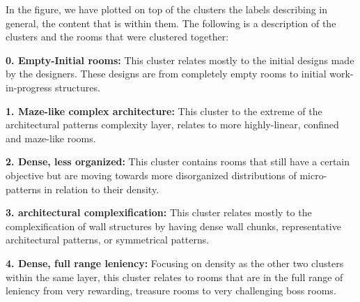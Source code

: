 


In the figure, we have plotted on top of the clusters the labels describing in general, the content that is within them. The following is a description of the clusters and the rooms that were clustered together:

\textbf{0. Empty-Initial rooms:} %
This cluster relates mostly to the initial designs made by the designers. These designs are from completely empty rooms to initial work-in-progress structures.

\textbf{1. Maze-like complex architecture:} This cluster to the extreme of the architectural patterns complexity layer, relates to more highly-linear, confined and maze-like rooms.%

\textbf{2. Dense, less organized:} This cluster contains rooms that still have a certain objective but are moving towards more disorganized distributions of micro-patterns in relation to their density. %

\textbf{3. architectural complexification:} %
This cluster relates mostly to the complexification of wall structures by having dense wall chunks, representative architectural patterns, or symmetrical patterns.

\textbf{4. Dense, full range leniency:} Focusing on density as the other two clusters within the same layer, this cluster relates to rooms that are in the full range of leniency from very rewarding, treasure rooms to very challenging boss rooms. %

